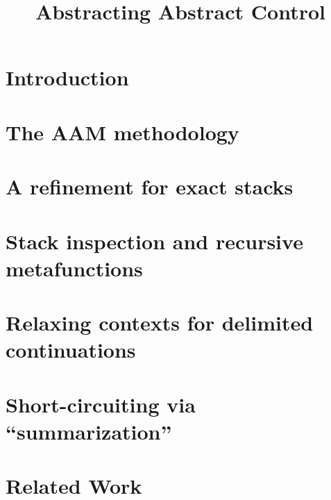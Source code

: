 \documentclass[preprint]{sigplanconf}
\title{Abstracting Abstract Control}
\begin{document}
\maketitle


\begin{abstract}

\end{abstract}

\section{Introduction}

\section{The AAM methodology}

\section{A refinement for exact stacks}\label{sec:pushdown}

\section{Stack inspection and recursive metafunctions}

\section{Relaxing contexts for delimited continuations}\label{sec:delim}

\section{Short-circuiting via ``summarization''}\label{sec:memo}

\section{Related Work}

\end{document}

